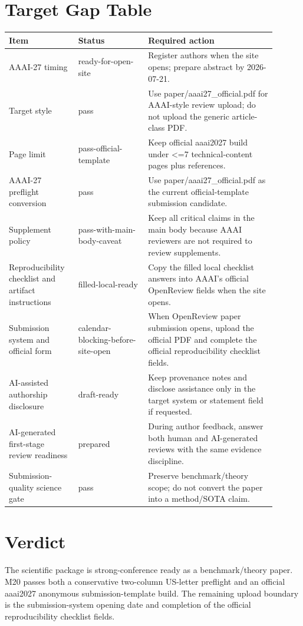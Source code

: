 \documentclass[10pt]{article}
\begin{document}
\section{Target Gap Table}
\small
\begin{longtable}{p{0.22\linewidth}p{0.24\linewidth}p{0.44\linewidth}}
\toprule
Item & Status & Required action\\
\midrule
AAAI-27 timing & ready-for-open-site & Register authors when the site opens; prepare abstract by 2026-07-21.\\
Target style & pass & Use paper/aaai27\_official.pdf for AAAI-style review upload; do not upload the generic article-class PDF.\\
Page limit & pass-official-template & Keep official aaai2027 build under <=7 technical-content pages plus references.\\
AAAI-27 preflight conversion & pass & Use paper/aaai27\_official.pdf as the current official-template submission candidate.\\
Supplement policy & pass-with-main-body-caveat & Keep all critical claims in the main body because AAAI reviewers are not required to review supplements.\\
Reproducibility checklist and artifact instructions & filled-local-ready & Copy the filled local checklist answers into AAAI's official OpenReview fields when the site opens.\\
Submission system and official form & calendar-blocking-before-site-open & When OpenReview paper submission opens, upload the official PDF and complete the official reproducibility checklist fields.\\
AI-assisted authorship disclosure & draft-ready & Keep provenance notes and disclose assistance only in the target system or statement field if requested.\\
AI-generated first-stage review readiness & prepared & During author feedback, answer both human and AI-generated reviews with the same evidence discipline.\\
Submission-quality science gate & pass & Preserve benchmark/theory scope; do not convert the paper into a method/SOTA claim.\\
\bottomrule
\end{longtable}
\normalsize

\section{Verdict}
The scientific package is strong-conference ready as a benchmark/theory paper. M20 passes both a conservative two-column US-letter preflight and an official aaai2027 anonymous submission-template build. The remaining upload boundary is the submission-system opening date and completion of the official reproducibility checklist fields.
\end{document}
